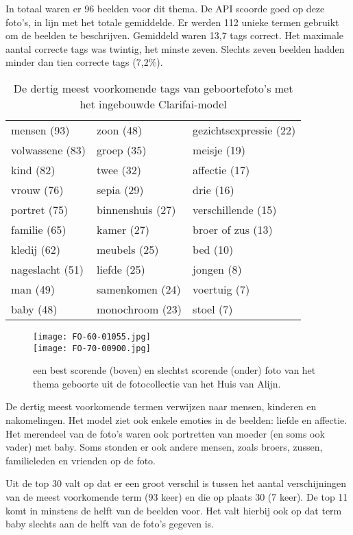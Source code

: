 In totaal waren er 96 beelden voor dit thema. De API scoorde goed op deze foto’s, in lijn met het totale gemiddelde. Er werden 112 unieke termen gebruikt om de beelden te beschrijven. Gemiddeld waren 13,7 tags correct. Het maximale aantal correcte tags was twintig, het minste zeven. Slechts zeven beelden hadden minder dan tien correcte tags (7,2\%).
\begin{table}
	\centering
	\begin{tabular}{*{3}{l}}
		\toprule
		mensen (93) & zoon (48) & gezichtsexpressie (22) \\
		volwassene (83) & 	groep (35) & meisje (19) \\
		kind (82) & twee (32) & affectie (17) \\
		vrouw (76) & sepia (29) & drie (16) \\
		portret (75) & binnenshuis (27) & verschillende (15) \\
		familie (65) & 	kamer (27) & broer of zus (13) \\
		kledij (62) & 	meubels (25) & bed (10) \\
		nageslacht (51) & liefde (25) & jongen (8) \\
		man (49) & samenkomen (24) & voertuig (7) \\
		baby (48) & monochroom (23) & stoel (7) \\	
		\bottomrule
	\end{tabular}
	\caption{De dertig meest voorkomende tags van geboortefoto's met het ingebouwde Clarifai-model}
	\label{tab:30-termen-geboorte}
\end{table}

\begin{figure}
	\centering
	\texttt{[image: FO-60-01055.jpg]}\hfill
    \\[\smallskipamount]
	\texttt{[image: FO-70-00900.jpg]}\hfill
	\caption[Best en slechtst scorende foto van thema geboorte]{een best scorende (boven) en slechtst scorende (onder) foto van het thema geboorte uit de fotocollectie van het Huis van Alijn.}
\end{figure}

De dertig meest voorkomende termen verwijzen naar mensen, kinderen en nakomelingen. Het model ziet ook enkele emoties in de beelden: liefde en affectie. Het merendeel van de foto’s waren ook portretten van moeder (en soms ook vader) met baby. Soms stonden er ook andere mensen, zoals broers, zussen, familieleden en vrienden op de foto. 

Uit de top 30 valt op dat er een groot verschil is tussen het aantal verschijningen van de meest voorkomende term (93 keer) en die op plaats 30 (7 keer). De top 11 komt in minstens de helft van de beelden voor. Het valt hierbij ook op dat term baby slechts aan de helft van de foto’s gegeven is.

